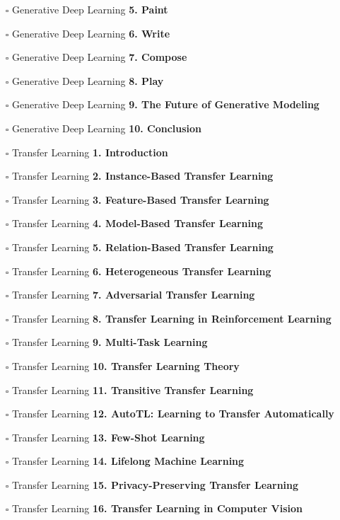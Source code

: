 \documentclass[a4, landscape, 12pt]{article}
\newcommand{\checkbox}{$\square$}%
\begin{document}
\begin{itemize}
{}
\item [\checkbox]  Generative Deep Learning \textbf{ 5. Paint
}
\item [\checkbox]  Generative Deep Learning \textbf{ 6. Write
}
\item [\checkbox]  Generative Deep Learning \textbf{ 7. Compose
}
\item [\checkbox]  Generative Deep Learning \textbf{ 8. Play
}
\item [\checkbox]  Generative Deep Learning \textbf{ 9. The Future of Generative Modeling
}
\item [\checkbox]  Generative Deep Learning \textbf{ 10. Conclusion
}
\item [\checkbox]  Transfer Learning \textbf{ 1. Introduction
}
\item [\checkbox]  Transfer Learning \textbf{ 2. Instance-Based Transfer Learning
}
\item [\checkbox]  Transfer Learning \textbf{ 3. Feature-Based Transfer Learning
}
\item [\checkbox]  Transfer Learning \textbf{ 4. Model-Based Transfer Learning
}
\item [\checkbox]  Transfer Learning \textbf{ 5. Relation-Based Transfer Learning
}
\item [\checkbox]  Transfer Learning \textbf{ 6. Heterogeneous Transfer Learning
}
\item [\checkbox]  Transfer Learning \textbf{ 7. Adversarial Transfer Learning
}
\item [\checkbox]  Transfer Learning \textbf{ 8. Transfer Learning in Reinforcement Learning
}
\item [\checkbox]  Transfer Learning \textbf{ 9. Multi-Task Learning
}
\item [\checkbox]  Transfer Learning \textbf{ 10. Transfer Learning Theory
}
\item [\checkbox]  Transfer Learning \textbf{ 11. Transitive Transfer Learning
}
\item [\checkbox]  Transfer Learning \textbf{ 12. AutoTL: Learning to Transfer Automatically
}
\item [\checkbox]  Transfer Learning \textbf{ 13. Few-Shot Learning
}
\item [\checkbox]  Transfer Learning \textbf{ 14. Lifelong Machine Learning
}
\item [\checkbox]  Transfer Learning \textbf{ 15. Privacy-Preserving Transfer Learning
}
\item [\checkbox]  Transfer Learning \textbf{ 16. Transfer Learning in Computer Vision
}
\end{itemize}
\end{document}
